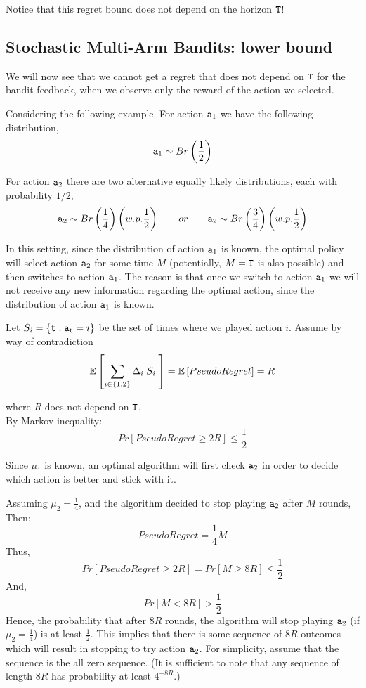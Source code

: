 Notice that this regret bound does not depend on  the horizon ${\tt T}$!

\subsection{Stochastic Multi-Arm Bandits: lower bound}


We will now see that we cannot get a regret that does not depend on ${\tt T}$ for the bandit feedback, when we observe only the reward of the action we selected.

Considering the following example. For action ${\tt a}_1$ we have the following distribution,
\[
{\tt a}_{1}\sim Br\left(\frac{1}{2}\right)\]

For action ${\tt a}_2$ there are two alternative equally likely  distributions, each with probability $1/2$,
\[
{\tt a}_{2}\sim Br\left(\frac{1}{4}\right) \left(w.p. \frac{1}{2}\right)
\qquad or \qquad {\tt a}_{2}\sim Br\left(\frac{3}{4}\right) \left(w.p.
\frac{1}{2}\right)
\]

In this setting, since the distribution of action ${\tt a}_1$ is known, the optimal policy will select action ${\tt a}_2$ for some time $M$ (potentially, $M={\tt T}$ is also possible) and then switches to action ${\tt a}_1$. The reason is that once we switch to action ${\tt a}_1$ we will not receive any new information regarding the optimal action, since the distribution of action ${\tt a}_1$ is known. 

Let $S_i=\{{\tt t}:{\tt a}_{\tt t}=i\}$ be the set of times where we played action $i$. 
Assume by way of contradiction
\[
\mathbb{E}\left[ \sum_{i \in \{1,2\}} \Delta_i |S_i|\right] = \mathbb{E}\left[Pseudo Regret\right]=R
\]

where $R$ does not depend on ${\tt T}$. \\ By Markov inequality:
\[
Pr\left[Pseudo Regret\ge2R\right]\le\frac{1}{2}
\]

Since $\mu_1$ is known, an optimal algorithm will first check ${\tt a}_2$
in order to decide which action is better and stick with it.

Assuming $\mu_2 = \frac{1}{4}$, and the algorithm decided to stop
playing ${\tt a}_2$ after $M$ rounds, Then:
\[
Pseudo Regret = \frac{1}{4}M
\]
Thus,
\[
Pr\left[Pseudo Regret\ge 2R \right] = Pr\left[ M\ge 8R
\right]\le\frac{1}{2}
\]
And,
\[
Pr\left[M < 8R \right]>\frac{1}{2}
\]
Hence, the probability that after $8R$ rounds, the algorithm will
stop playing ${\tt a}_2$ (if $\mu_2 = \frac{1}{4}$) is at least
$\frac{1}{2}$. This implies that there is some sequence of $8R$
outcomes which will result in stopping to try action ${\tt a}_2$. For simplicity, assume that the sequence is the all zero sequence. (It is sufficient to note that any sequence of length $8R$ has probability at least $4^{-8R}$.)


